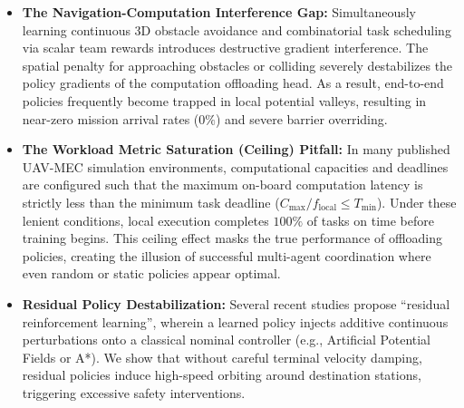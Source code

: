 \documentclass[conference]{IEEEtran}
\begin{document}
\begin{itemize}
    \item \textbf{The Navigation-Computation Interference Gap:} Simultaneously learning continuous 3D obstacle avoidance and combinatorial task scheduling via scalar team rewards introduces destructive gradient interference. The spatial penalty for approaching obstacles or colliding severely destabilizes the policy gradients of the computation offloading head. As a result, end-to-end policies frequently become trapped in local potential valleys, resulting in near-zero mission arrival rates ($0\%$) and severe barrier overriding.
    \item \textbf{The Workload Metric Saturation (Ceiling) Pitfall:} In many published UAV-MEC simulation environments, computational capacities and deadlines are configured such that the maximum on-board computation latency is strictly less than the minimum task deadline ($C_{\text{max}} / f_{\text{local}} \le T_{\text{min}}$). Under these lenient conditions, local execution completes $100\%$ of tasks on time before training begins. This ceiling effect masks the true performance of offloading policies, creating the illusion of successful multi-agent coordination where even random or static policies appear optimal.
    \item \textbf{Residual Policy Destabilization:} Several recent studies propose ``residual reinforcement learning'', wherein a learned policy injects additive continuous perturbations onto a classical nominal controller (e.g., Artificial Potential Fields or A*). We show that without careful terminal velocity damping, residual policies induce high-speed orbiting around destination stations, triggering excessive safety interventions.
\end{itemize}
\end{document}

